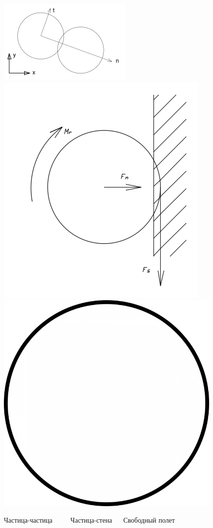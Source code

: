 \documentclass[c]{beamer}  %
\begin{document}
\begin{frame}
\frametitle{\insertsection} 
\framesubtitle{\insertsubsection}

\begin{figure}[h!]
	\centering
	\vspace*{-2cm}
	\includegraphics[width=0.5\textheight]{local}
	\includegraphics[width=0.4\textheight]{ball_wall}
	\includegraphics[width=0.3\textheight]{ball_simple}
	\caption{Частица-частица $\qquad$ Частица-стена $\quad$ Свободный полет $\qquad$}
\end{figure} 
\end{frame}
\end{document}
